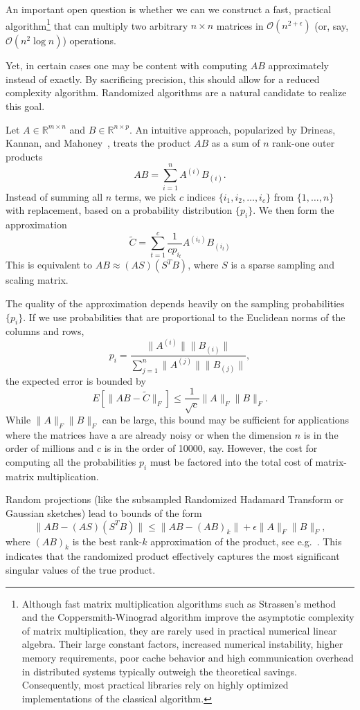 An important open question is whether we can we construct a fast, practical algorithm\footnote{Although fast matrix multiplication algorithms such as Strassen’s method and the Coppersmith-Winograd algorithm improve the asymptotic complexity of matrix multiplication, they are rarely used in practical numerical linear algebra. Their large constant factors, increased numerical instability, higher memory requirements,  poor cache behavior and high communication overhead in distributed systems typically outweigh the theoretical savings. Consequently, most practical libraries rely on highly optimized implementations of the classical algorithm.} that can multiply two arbitrary $n\times n$ matrices
in ${\mathcal O}(n^{2+\epsilon})$ (or, say, ${\mathcal O}(n^{2}\log n)$) operations.

Yet, in certain cases one may be content with computing $AB$ approximately instead of exactly. By sacrificing precision, this should allow for a reduced complexity algorithm. Randomized algorithms are a natural candidate to realize this goal.

Let $A \in \mathbb{R}^{m \times n}$ and $B \in \mathbb{R}^{n \times p}$. An intuitive approach, popularized by Drineas, Kannan, and Mahoney~\cite{drineas2006fast}, treats the product $AB$ as a sum of $n$ rank-one outer products
$$AB = \sum_{i=1}^n A^{(i)} B_{(i)}.$$
Instead of summing all $n$ terms, we pick $c$ indices $\{i_1, i_2, \dots, i_c\}$ from $\{1, \dots, n\}$ with replacement, based on a probability distribution $\{p_i\}$. We then form the approximation
$$\widetilde{C} = \sum_{t=1}^c \frac{1}{c p_{i_t}} A^{(i_t)} B_{(i_t)}$$
This is equivalent to $AB \approx (AS)(S^T B)$, where $S$ is a sparse sampling and scaling matrix.

The quality of the approximation depends heavily on the sampling probabilities $\{p_i\}$.
If we use  probabilities that are proportional to the Euclidean norms of the columns and rows, 
$$p_i = \frac{\|A^{(i)}\| \|B_{(i)}\|}{\sum_{j=1}^n \|A^{(j)}\| \|B_{(j)}\|},$$
the expected error is bounded by
$$E[\|AB - \widetilde{C}\|_F] \leq \frac{1}{\sqrt{c}} \|A\|_F \|B\|_F.$$
While $\|A\|_F \|B\|_F$ can be large, this bound may be sufficient for applications where the matrices have a  are already noisy or when the dimension $n$ is in the order of millions and $c$ is in the order of 10000, say. However, the cost for computing all the probabilities $p_i$ must be factored into the total cost of matrix-matrix multiplication.


Random projections (like the subsampled Randomized Hadamard Transform or Gaussian sketches) lead to bounds of the form
$$\|AB - (AS)(S^T B)\| \leq \|AB - (AB)_k\| + \epsilon \|A\|_F \|B\|_F,$$
where $(AB)_k$ is the best rank-$k$ approximation of the product, see e.g.~\cite{HMT11,cohen2015optimal}. This indicates that the randomized product effectively captures the most significant singular values of the true product.

